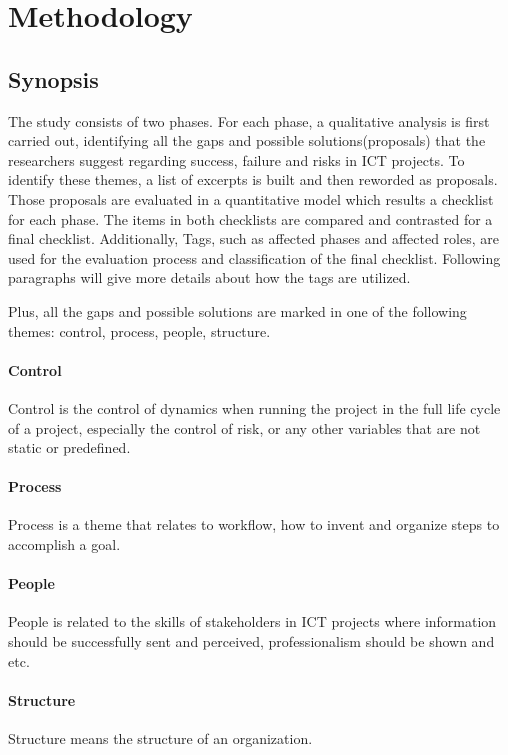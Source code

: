 
\section{Methodology}
\subsection{Synopsis}
The study consists of two phases. For each phase, a qualitative analysis is first carried out, identifying all the gaps and possible solutions(proposals) that the researchers suggest regarding success, failure and risks in ICT projects. To identify these themes, a list of excerpts is built and then reworded as proposals. Those proposals are evaluated in a quantitative model which results a checklist for each phase. The items in both checklists are compared and contrasted for a final checklist. Additionally, Tags, such as affected phases and affected roles, are used for the evaluation process and classification of the final checklist. Following paragraphs will give more details about how the tags are utilized.

Plus, all the gaps and possible solutions are marked in one of the following themes: control, process, people, structure.

\paragraph{Control} Control is the control of dynamics when running the project in the full life cycle of a project, especially the control of risk, or any other variables that are not static or predefined.

\paragraph{Process} Process is a theme that relates to workflow, how to invent and organize steps to accomplish a goal.

\paragraph{People} People is related to the skills of stakeholders in ICT projects where information should be successfully sent and perceived, professionalism should be shown and etc.

\paragraph{Structure} Structure means the structure of an organization.


